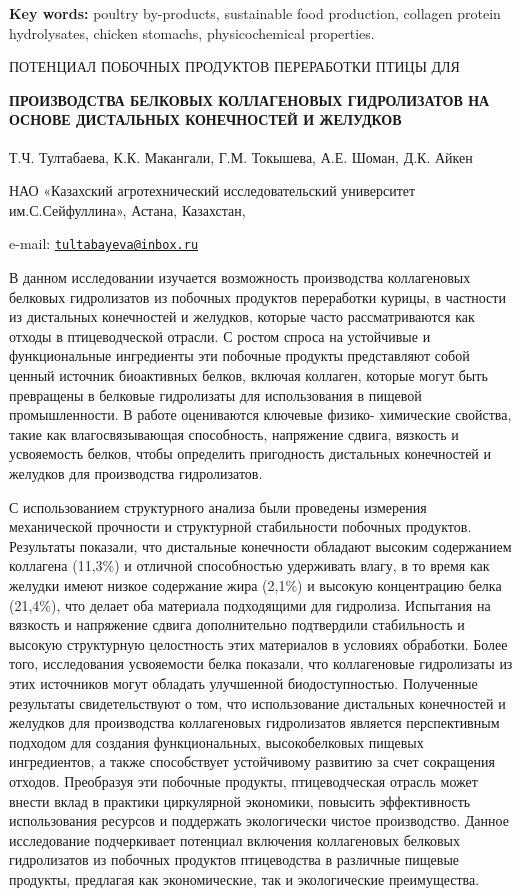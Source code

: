{\bfseries Key words:} poultry by-products, sustainable food production,
collagen protein hydrolysates, chicken stomachs, physicochemical
properties.

ПОТЕНЦИАЛ ПОБОЧНЫХ ПРОДУКТОВ ПЕРЕРАБОТКИ ПТИЦЫ ДЛЯ

{\bfseries ПРОИЗВОДСТВА БЕЛКОВЫХ КОЛЛАГЕНОВЫХ ГИДРОЛИЗАТОВ НА ОСНОВЕ
ДИСТАЛЬНЫХ КОНЕЧНОСТЕЙ И ЖЕЛУДКОВ}

Т.Ч. Тултабаева\textsuperscript{\envelope }, К.К. Макангали, Г.М. Токышева, А.Е.
Шоман, Д.К. Айкен

НАО «Казахский агротехнический исследовательский университет
им.С.Сейфуллина», Астана, Казахстан,

e-mail:
\href{mailto:tultabayeva@inbox.ru}{\nolinkurl{tultabayeva@inbox.ru}}

В данном исследовании изучается возможность производства коллагеновых
белковых гидролизатов из побочных продуктов переработки курицы, в
частности из дистальных конечностей и желудков, которые часто
рассматриваются как отходы в птицеводческой отрасли. С ростом спроса на
устойчивые и функциональные ингредиенты эти побочные продукты
представляют собой ценный источник биоактивных белков, включая коллаген,
которые могут быть превращены в белковые гидролизаты для использования в
пищевой промышленности. В работе оцениваются ключевые физико- химические
свойства, такие как влагосвязывающая способность, напряжение сдвига,
вязкость и усвояемость белков, чтобы определить пригодность дистальных
конечностей и желудков для производства гидролизатов.

С использованием структурного анализа были проведены измерения
механической прочности и структурной стабильности побочных продуктов.
Результаты показали, что дистальные конечности обладают высоким
содержанием коллагена (11,3\%) и отличной способностью удерживать влагу,
в то время как желудки имеют низкое содержание жира (2,1\%) и высокую
концентрацию белка (21,4\%), что делает оба материала подходящими для
гидролиза. Испытания на вязкость и напряжение сдвига дополнительно
подтвердили стабильность и высокую структурную целостность этих
материалов в условиях обработки. Более того, исследования усвояемости
белка показали, что коллагеновые гидролизаты из этих источников могут
обладать улучшенной биодоступностью. Полученные результаты
свидетельствуют о том, что использование дистальных конечностей и
желудков для производства коллагеновых гидролизатов является
перспективным подходом для создания функциональных, высокобелковых
пищевых ингредиентов, а также способствует устойчивому развитию за счет
сокращения отходов. Преобразуя эти побочные продукты, птицеводческая
отрасль может внести вклад в практики циркулярной экономики, повысить
эффективность использования ресурсов и поддержать экологически чистое
производство. Данное исследование подчеркивает потенциал включения
коллагеновых белковых гидролизатов из побочных продуктов птицеводства в
различные пищевые продукты, предлагая как экономические, так и
экологические преимущества.

